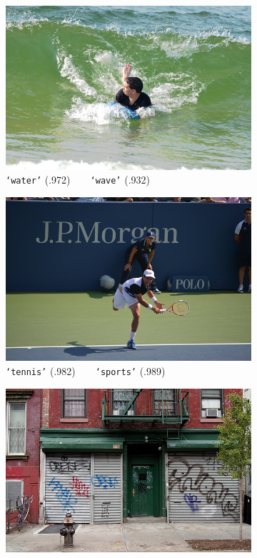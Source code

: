 {\begin{landscape}
\begin{figure}[th]
    \begin{subfigure}{.3\linewidth}
        \centering
        \includegraphics[width=.8\linewidth]{evolution-waves}
        \caption{\texttt{`water'} (.972)~~\ra{}~~\texttt{`wave'} (.932)}
    \end{subfigure}
    \hfill
    \begin{subfigure}{.3\linewidth}
        \centering
        \includegraphics[width=.8\linewidth]{evolution-tennis}
        \caption{\texttt{`tennis'} (.982)~~\ra{}~~\texttt{`sports'} (.989)}
    \end{subfigure}
    \hfill
    \begin{subfigure}{.3\linewidth}
        \centering
        \includegraphics[width=.8\linewidth]{evolution-neighbourhood}

\end{subfigure}
\end{figure}
\end{landscape}}
